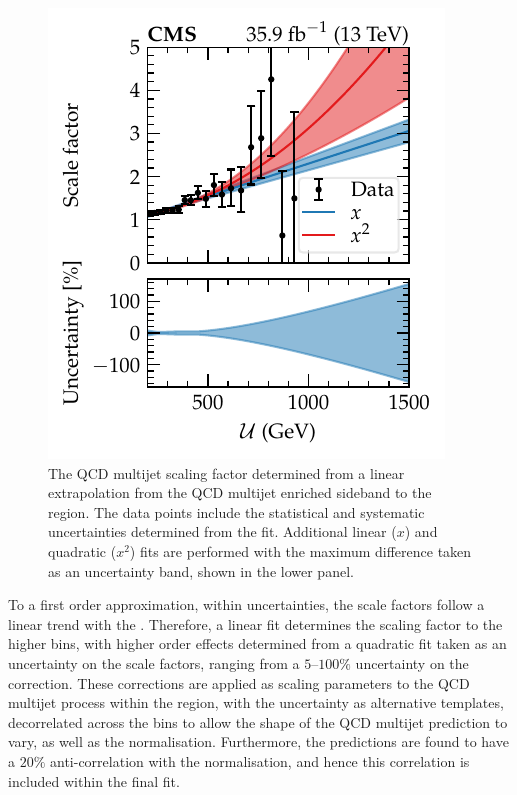 %
\begin{figure}
    \centering
    \includegraphics{chapters/042_backgrounds/images/qcd_estimation.pdf}
    \caption[QCD multijet scaling factor for the signal region.]{
        The QCD multijet scaling factor determined from a linear extrapolation from the QCD multijet enriched sideband to the \metplusjets region. The data points include the statistical and systematic uncertainties determined from the fit. Additional linear ($x$) and quadratic ($x^2$) fits are performed with the maximum difference taken as an uncertainty band, shown in the lower panel.
    }
    \label{fig:qcd_estimation}
\end{figure}
%
To a first order approximation, within uncertainties, the scale factors follow a linear trend with the \recoil. Therefore, a linear fit determines the scaling factor to the higher \recoil bins, with higher order effects determined from a quadratic fit taken as an uncertainty on the scale factors, ranging from a $5$--$100\%$ uncertainty on the correction. These corrections are applied as scaling parameters to the QCD multijet process within the \metplusjets region, with the uncertainty as alternative templates, decorrelated across the \recoil bins to allow the shape of the QCD multijet prediction to vary, as well as the normalisation. Furthermore, the predictions are found to have a $20\%$ anti-correlation with the \IZvvj normalisation, and hence this correlation is included within the final fit.


